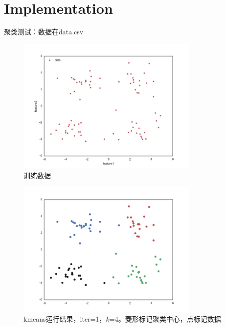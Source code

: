\documentclass{ctexart}
\begin{document}
\section{Implementation}
聚类测试：数据在data.csv
\begin{figure}[H]
\begin{center}
\includegraphics[width=0.8\textwidth]{fig/raw.png} %
\caption{训练数据}
\end{center}
\end{figure}

\begin{figure}[H]
\begin{center}
\includegraphics[width=0.8\textwidth]{fig/iter-01.png} %
\caption{kmeans运行结果，iter=1，$k$=4。菱形标记聚类中心，点标记数据}
\end{center}
\end{figure}
\end{document}
